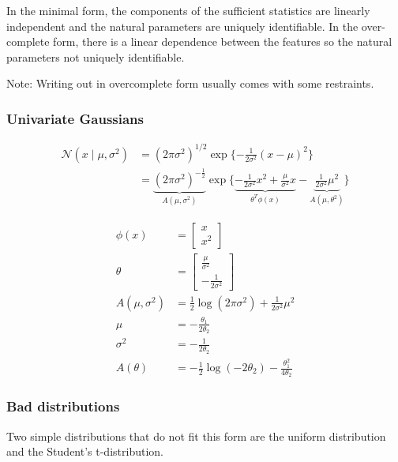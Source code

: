 \documentclass{article}
\begin{document}
\medskip

In the minimal form, the components of the sufficient statistics are linearly independent and the natural parameters are uniquely identifiable. In the over-complete form, there is a linear dependence between the features so the natural parameters not uniquely identifiable.

\medskip

Note: Writing out in overcomplete form usually comes with some restraints.

\subsubsection{Univariate Gaussians}

\begin{align*}
\mathcal{N} ( x \mid \mu, \sigma^2) &= (2 \pi \sigma^2)^{1/2} \exp \{ -\frac{1}{2\sigma^2} (x - \mu)^2 \} \\
&= \underbrace{(2\pi \sigma^2)^{-\frac{1}{2}}}_{A(\mu, \sigma^2)} \exp\{\underbrace{-\frac{1}{2\sigma^2}x^2 + \frac{\mu}{\sigma^2}x}_{\theta^T \phi(x)} - \underbrace{\frac{1}{2\sigma^2} \mu^2}_{A(\mu, \theta^2)}\}
\end{align*}

\begin{align*}
\phi(x) &= \begin{bmatrix} x \\ x^2 \end{bmatrix} \\
\theta &= \begin{bmatrix} \frac{\mu}{\sigma^2} \\ -\frac{1}{2\sigma^2} \end{bmatrix}\\
A(\mu, \sigma^2) &= \frac{1}{2}\log(2\pi\sigma^2) + \frac{1}{2\sigma^2}\mu^2
\\
\mu &= - \frac{\theta_1}{2\theta_2}
\\
\sigma^2 &= - \frac{1}{2\theta_2}
\\
A(\theta) &= - \frac12 \log( -2 \theta_2) - \frac{\theta_1^2}{4 \theta_2}
\end{align*}

\subsubsection{Bad distributions}
Two simple distributions that do not fit this form are the uniform distribution and the Student's t-distribution.

\medskip
\end{document}
